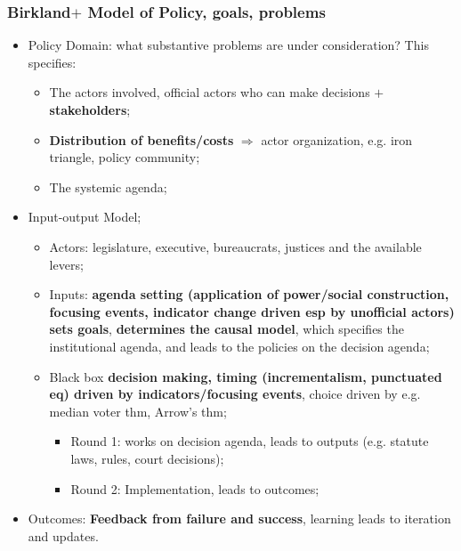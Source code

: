 \documentclass[aspectratio=169]{beamer}
\theoremstyle{principle}
\begin{document}
\begin{frame}
\frametitle{Birkland$+$ Model of Policy, goals, problems}
\begin{itemize}
\item Policy Domain: what substantive problems are under consideration?  This specifies:
\begin{itemize}
\item The actors involved, official actors who can make decisions $+$ \textbf{stakeholders}; 
\item \textbf{Distribution of benefits/costs} $\Rightarrow$ actor organization, e.g. iron triangle, policy community;
\item The systemic agenda; 
\end{itemize}
\bigskip
\item \color{black}Input-output Model;
\begin{itemize}
\item Actors: legislature, executive, bureaucrats, justices and the available levers;
\item Inputs: \textbf{agenda setting (application of power/social construction, focusing events, indicator change driven esp by unofficial actors)} \textbf{sets goals}, \textbf{determines the causal model}, which specifies the institutional agenda, and leads to the policies on the decision agenda;
\item Black box \textbf{decision making, timing (incrementalism, punctuated eq) driven by indicators/focusing events}, choice driven by e.g. median voter thm, Arrow's thm;
\begin{itemize}
\item Round 1: works on decision agenda, leads to outputs (e.g. statute laws, rules, court decisions);
\item Round 2: Implementation, leads to outcomes;
 \end{itemize}
\end{itemize}
\bigskip
\item Outcomes: \textbf{Feedback from failure and success}, learning leads to iteration and updates.
\end{itemize}
\end{frame}
\end{document}
